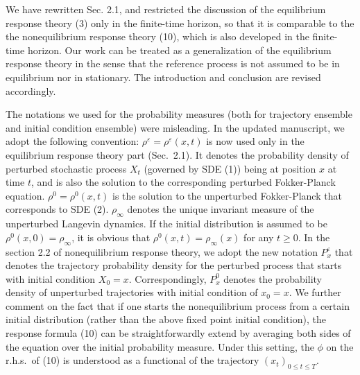 \documentclass[]{revtex4-1}
\begin{document}
We have rewritten Sec. 2.1, and restricted the discussion of the
equilibrium response theory (3) only in the finite-time
horizon, so that it is comparable to the the nonequilibrium response theory (10), which is also
developed in the finite-time horizon. Our work
can be treated as a
generalization of the equilibrium response theory in the sense that the
reference process is not assumed to be in equilibrium nor in stationary.
The introduction and conclusion are revised accordingly.

The notations we used for the probability measures (both for
trajectory ensemble and initial condition ensemble) were misleading.
In the updated manuscript, we adopt the following convention:
$\rho^\varepsilon = \rho^\varepsilon(x,t)$ is now used only in the equilibrium
response theory part (Sec.~2.1). It denotes the probability density of
perturbed stochastic process $X_t$ (governed by SDE (1))
being at position $x$ at time $t$,
and is also the solution to the corresponding perturbed Fokker-Planck
equation. 
$\rho^0 = \rho^0(x, t)$
is the solution to the unperturbed Fokker-Planck that corresponds
to SDE (2). $\rho_\infty$ denotes the unique invariant measure of the
unperturbed Langevin dynamics.
If the initial distribution is assumed to be
$\rho^0(x, 0) = \rho_\infty$, it is obvious
that $\rho^0(x, t) = \rho_\infty(x)$ for any $t\geq 0$.
In the section 2.2 of nonequilibrium response theory, we adopt the new notation
$P_x^\varepsilon$ that denotes the trajectory probability density for the
perturbed process that starts with initial condition $X_0 = x$.
Correspondingly, $P_x^0$ denotes the probability density of
unperturbed trajectories with initial condition of $x_0 = x$.
We further
comment on the fact that if one starts the nonequilibrium process 
from a certain initial distribution (rather than the above fixed point
initial condition),
the response formula (10) can
be straightforwardly extend by averaging both sides of the equation over
the initial probability measure.
Under this setting, the $\phi$ on the r.h.s.~of (10) is understood
as a functional of the trajectory $(x_t)_{0\leq t\leq T}$. 
\\
\end{document}

